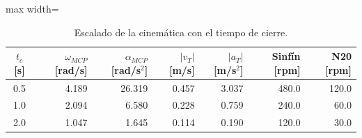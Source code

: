 \begin{table}[H]
\centering

\begin{adjustbox}{max width=\textwidth}
\begin{tabular}{|c|r|r|r|r|r|r|}
\hline
\textbf{$t_c$ [s]} & \textbf{$\omega_{MCP}$ [rad/s]} & \textbf{$\alpha_{MCP}$ [rad/s$^2$]} & \textbf{$|v_T|$ [m/s]} & \textbf{$|a_T|$ [m/s$^2$]} & \textbf{Sinfín [rpm]} & \textbf{N20 [rpm]} \\ \hline
0.5 & 4.189 & 26.319 & 0.457 & 3.037 & 480.0 & 120.0 \\ \hline
1.0 & 2.094 & 6.580 & 0.228 & 0.759 & 240.0 & 60.0 \\ \hline
2.0 & 1.047 & 1.645 & 0.114 & 0.190 & 120.0 & 30.0 \\ \hline
\end{tabular}
\end{adjustbox}
\caption{Escalado de la cinemática con el tiempo de cierre.}
\label{tab:escala}
\end{table}